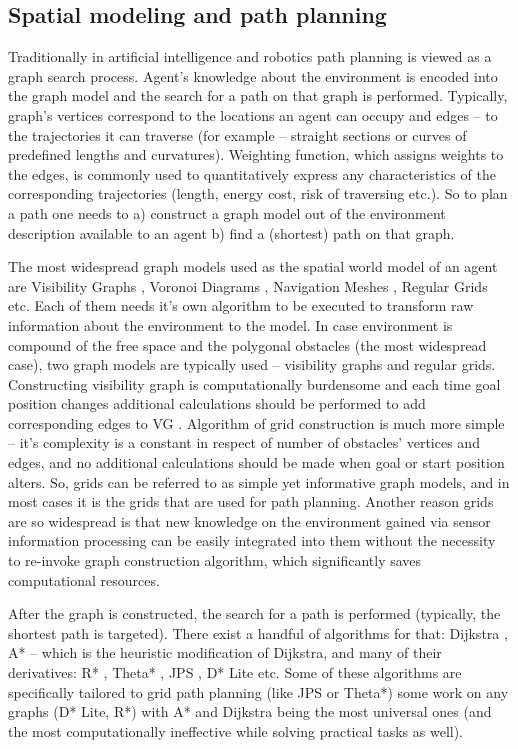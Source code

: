 \documentclass[runningheads,a4paper]{llncs}
\begin{document}
\subsection{Spatial modeling and path planning}

Traditionally in artificial intelligence and robotics path planning is viewed as a graph search process. Agent's knowledge about the environment is encoded into the graph model and the search for a path on that graph is performed. Typically, graph's vertices correspond to the locations an agent can occupy and edges – to the trajectories it can traverse (for example – straight sections or curves of predefined lengths and curvatures). Weighting function, which assigns weights to the edges, is commonly used to quantitatively express any characteristics of the corresponding trajectories (length, energy cost, risk of traversing etc.). So to plan a path one needs to a) construct a graph model out of the environment description available to an agent b) find a (shortest) path on that graph.

The most widespread graph models used as the spatial world model of an agent are Visibility Graphs \cite{Lozano1979}, Voronoi Diagrams \cite{Bhattacharya2008}, Navigation Meshes \cite{Kallmann2010}, Regular Grids \cite{Yap2002} etc. Each of them needs it's own algorithm to be executed to transform raw information about the environment to the model. In case environment is compound of the free space and the polygonal obstacles (the most widespread case), two graph models are typically used – visibility graphs and regular grids. Constructing visibility graph is computationally burdensome and each time goal position changes additional calculations should be performed to add corresponding edges to VG \cite{Wooden2006}. Algorithm of grid construction is much more simple – it's complexity is a constant in respect of number of obstacles' vertices and edges, and no additional calculations should be made when goal or start position alters. So, grids can be referred to as simple yet informative graph models, and in most cases it is the grids that are used for path planning. Another reason grids are so widespread is that new knowledge on the environment gained via sensor information processing can be easily integrated into them \cite{Elfes1989} without the necessity to re-invoke graph construction algorithm, which significantly saves computational resources.

After the graph is constructed, the search for a path is performed (typically, the shortest path is targeted). There exist a handful of algorithms for that: Dijkstra \cite{Dijkstra1959}, A* \cite{Hart1968} – which is the heuristic modification of Dijkstra, and many of their derivatives: R* \cite{Likhachev2008}, Theta* \cite{Nash2007}, JPS \cite{Harabor2011}, D* Lite \cite{Koenig2000} etc. Some of these algorithms are specifically tailored to grid path planning (like JPS or Theta*) some work on any graphs (D* Lite, R*) with A* and Dijkstra being the most universal ones (and the most computationally ineffective while solving practical tasks as well).
\end{document}
